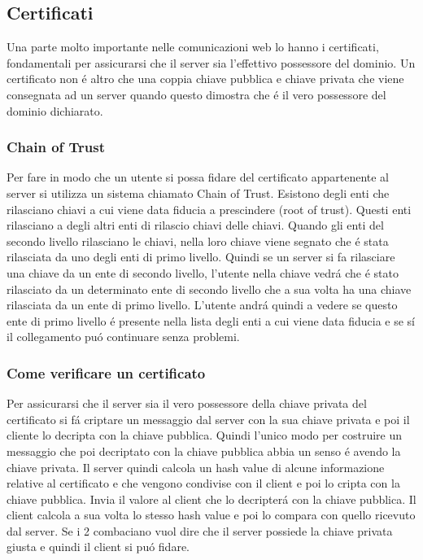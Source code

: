 \subsection{Certificati}
Una parte molto importante nelle comunicazioni web lo hanno i certificati, fondamentali per assicurarsi che il server sia l'effettivo possessore del dominio. Un certificato non é altro che una coppia chiave pubblica e chiave privata che viene consegnata ad un server quando questo dimostra che é il vero possessore del dominio dichiarato.
\subsubsection{Chain of Trust}
Per fare in modo che un utente si possa fidare del certificato appartenente al server si utilizza un sistema chiamato Chain of Trust. Esistono degli enti che rilasciano chiavi a cui viene data fiducia a prescindere (root of trust). Questi enti rilasciano a degli altri enti di rilascio chiavi delle chiavi. Quando gli enti del secondo livello rilasciano le chiavi, nella loro chiave viene segnato che é stata rilasciata da uno degli enti di primo livello. Quindi se un server si fa rilasciare una chiave da un ente di secondo livello, l'utente nella chiave vedrá che é stato rilasciato da un determinato ente di secondo livello che a sua volta ha una chiave rilasciata da un ente di primo livello. L'utente andrá quindi a vedere se questo ente di primo livello é presente nella lista degli enti a cui viene data fiducia e se sí il collegamento puó continuare senza problemi.

\subsubsection{Come verificare un certificato}
Per assicurarsi che il server sia il vero possessore della chiave privata del certificato si fá criptare un messaggio dal server con la sua chiave privata e poi il cliente lo decripta con la chiave pubblica. Quindi l'unico modo per costruire un messaggio che poi decriptato con la chiave pubblica abbia un senso é avendo la chiave privata. Il server quindi calcola un hash value di alcune informazione relative al certificato e che vengono condivise con il client e poi lo cripta con la chiave pubblica. Invia il valore al client che lo decripterá con la chiave pubblica. Il client calcola a sua volta lo stesso hash value e poi lo compara con quello ricevuto dal server. Se i 2 combaciano vuol dire che il server possiede la chiave privata giusta e quindi il client si puó fidare.

